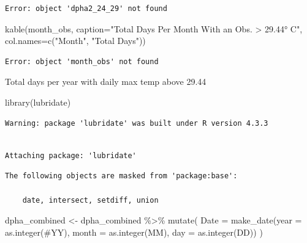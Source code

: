 \documentclass[
  letterpaper,
  DIV=11,
  numbers=noendperiod]{scrreprt}
\newenvironment{Shaded}{\begin{snugshade}}{\end{snugshade}}
\newcommand{\AttributeTok}[1]{\textcolor[rgb]{0.40,0.45,0.13}{#1}}
\newcommand{\FunctionTok}[1]{\textcolor[rgb]{0.28,0.35,0.67}{#1}}
\newcommand{\NormalTok}[1]{\textcolor[rgb]{0.00,0.23,0.31}{#1}}
\newcommand{\OtherTok}[1]{\textcolor[rgb]{0.00,0.23,0.31}{#1}}
\newcommand{\SpecialCharTok}[1]{\textcolor[rgb]{0.37,0.37,0.37}{#1}}
\newcommand{\StringTok}[1]{\textcolor[rgb]{0.13,0.47,0.30}{#1}}
\begin{document}
\begin{verbatim}
Error: object 'dpha2_24_29' not found
\end{verbatim}

\begin{Shaded}
\begin{Highlighting}[]
\FunctionTok{kable}\NormalTok{(month\_obs, }\AttributeTok{caption=}\StringTok{"Total Days Per Month With an Obs. \textgreater{} 29.44° C"}\NormalTok{, }\AttributeTok{col.names=}\FunctionTok{c}\NormalTok{(}\StringTok{"Month"}\NormalTok{, }\StringTok{"Total Days"}\NormalTok{))}
\end{Highlighting}
\end{Shaded}

\begin{verbatim}
Error: object 'month_obs' not found
\end{verbatim}

Total days per year with daily max temp above 29.44

\begin{Shaded}
\begin{Highlighting}[]
\FunctionTok{library}\NormalTok{(lubridate)}
\end{Highlighting}
\end{Shaded}

\begin{verbatim}
Warning: package 'lubridate' was built under R version 4.3.3
\end{verbatim}

\begin{verbatim}

Attaching package: 'lubridate'
\end{verbatim}

\begin{verbatim}
The following objects are masked from 'package:base':

    date, intersect, setdiff, union
\end{verbatim}

\begin{Shaded}
\begin{Highlighting}[]
\NormalTok{dpha\_combined }\OtherTok{\textless{}{-}}\NormalTok{ dpha\_combined }\SpecialCharTok{\%\textgreater{}\%}
  \FunctionTok{mutate}\NormalTok{(}
    \AttributeTok{Date =} \FunctionTok{make\_date}\NormalTok{(}\AttributeTok{year =} \FunctionTok{as.integer}\NormalTok{(}\StringTok{\textasciigrave{}}\AttributeTok{\#YY}\StringTok{\textasciigrave{}}\NormalTok{), }\AttributeTok{month =} \FunctionTok{as.integer}\NormalTok{(MM), }\AttributeTok{day =} \FunctionTok{as.integer}\NormalTok{(DD))}
\NormalTok{  )}
\end{Highlighting}
\end{Shaded}
\end{document}
